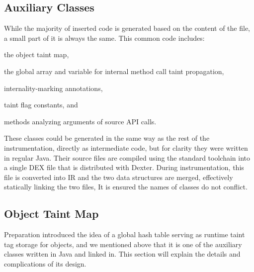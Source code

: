 \documentclass[12pt,twoside,notitlepage]{report}
\begin{document}

\label{section:Code_MethodEntering}

\subsection{Auxiliary Classes}

While the majority of inserted code is generated based on the content of the file, a small part of it is always the same. This common code includes:
\begin{inparaenum}[(i)]
\item the object taint map,
\item the global array and variable for internal method call taint propagation,
\item internality-marking annotations,
\item taint flag constants, and
\item methods analyzing arguments of source API calls.
\end{inparaenum}

These classes could be generated in the same way as the rest of the instrumentation, directly as intermediate code, but for clarity they were written in regular Java. Their source files are compiled using the standard toolchain into a single DEX file that is distributed with Dexter. During instrumentation, this file is converted into IR and the two data structures are merged, effectively statically linking the two files, It is ensured the names of classes do not conflict.

\subsection{Object Taint Map}
\label{section:Code_ObjectTaintMap}

Preparation introduced the idea of a global hash table serving as runtime taint tag storage for objects, and we mentioned above that it is one of the auxiliary classes written in Java and linked in. This section will explain the details and complications of its design.
\end{document}

